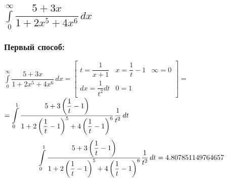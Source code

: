 \documentclass[12pt,a4paper]{article}
\begin{document}
\subsection{$\displaystyle \int \limits_0^\infty \dfrac{5+3x}{1+2x^5+4x^6}\,dx$}
\subsubsection*{Первый способ:}
$\displaystyle\int\limits_0^\infty \dfrac{5+3x}{1+2x^5+4x^6}\,dx=\begin{bmatrix}t=\dfrac{1}{x+1}&x=\dfrac{1}{t}-1&\infty=0\\dx=\dfrac{1}{t^2}dt&0=1\end{bmatrix}=$
\newpage
$\displaystyle=\int\limits_0^{1} \dfrac{5+3\left(\dfrac{1}{t}-1\right)}{1+2\left(\dfrac{1}{t}-1\right)^5+4\left(\dfrac{1}{t}-1\right)^6}\dfrac{1}{t^2}\,dt\\$\\
$$\int\limits_0^{1} \dfrac{5+3\left(\dfrac{1}{t}-1\right)}{1+2\left(\dfrac{1}{t}-1\right)^5+4\left(\dfrac{1}{t}-1\right)^6}\dfrac{1}{t^2}\,dt=4.807851149764657\\$$
\end{document}
